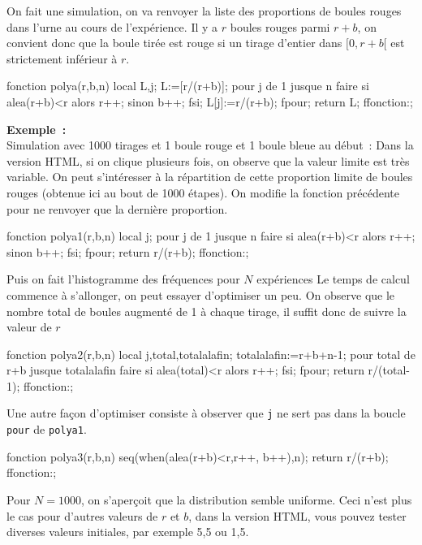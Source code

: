\documentclass[12pt,a4paper]{book}
\begin{document}
\begin{giacjshere}
On fait une simulation, on va renvoyer 
la liste des proportions de boules rouges
dans l'urne au cours de l'exp\'erience.
Il y a $r$ boules rouges parmi $r+b$, on convient donc que
la boule tir\'ee est rouge si un tirage d'entier dans $[0,r+b[$
est strictement inf\'erieur \`a $r$.
\begin{giaconload}
fonction polya(r,b,n)
  local L,j;
  L:=[r/(r+b)];
  pour j de 1 jusque n faire
    si alea(r+b)<r alors r++; sinon b++; fsi;
    L[j]:=r/(r+b);
  fpour;
  return L;
ffonction:;
\end{giaconload}
{\bf Exemple~:}\\
Simulation avec 1000 tirages et 1 boule rouge et 1 boule bleue au d\'ebut~:
Dans la version HTML, si on clique plusieurs fois, on observe que la valeur
limite est tr\`es variable.
On peut s'int\'eresser \`a la r\'epartition de cette proportion limite
de boules rouges (obtenue ici au bout de 1000 \'etapes). On modifie
la fonction pr\'ec\'edente pour ne renvoyer que la derni\`ere proportion.
\begin{giaconload}
fonction polya1(r,b,n)
  local j;
  pour j de 1 jusque n faire
    si alea(r+b)<r alors r++; sinon b++; fsi;
  fpour;
  return r/(r+b);
ffonction:;
\end{giaconload}
Puis on fait l'histogramme des fr\'equences pour $N$ exp\'eriences
Le temps de calcul commence
\`a s'allonger, on peut essayer d'optimiser un peu. On observe
que le nombre total de boules augment\'e de 1 \`a chaque tirage, 
il suffit donc de suivre la valeur de $r$
\begin{giaconload}
fonction polya2(r,b,n)
  local j,total,totalalafin;
  totalalafin:=r+b+n-1;
  pour total de r+b jusque totalalafin faire
    si alea(total)<r alors r++; fsi;
  fpour;
  return r/(total-1);
ffonction:;
\end{giaconload}
Une autre fa\c{c}on d'optimiser consiste \`a observer que \verb|j|
ne sert pas dans la boucle \verb|pour| de \verb|polya1|.
\begin{giaconload}
fonction polya3(r,b,n)
  seq(when(alea(r+b)<r,r++, b++),n);
  return r/(r+b);
ffonction:;
\end{giaconload}
Pour $N=1000$, on s'aper\c{c}oit que
la distribution semble uniforme. Ceci n'est plus le cas pour
d'autres valeurs de $r$ et $b$, dans la version HTML, vous pouvez
tester diverses valeurs initiales, par exemple 5,5 ou 1,5.


\end{giacjshere}
\end{document}
